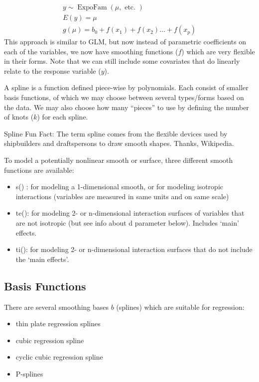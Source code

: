 \documentclass[
]{book}
\providecommand{\tightlist}{%
  \setlength{\itemsep}{0pt}\setlength{\parskip}{0pt}}
\begin{document}
\[
\begin{gathered}
y \sim \operatorname{ExpoFam}(\mu, \text { etc. }) \\
E(y)=\mu \\
g(\mu)=b_{0}+f\left(x_{1}\right)+f\left(x_{2}\right) \ldots+f\left(x_{p}\right)
\end{gathered}
\] This approach is similar to GLM, but now instead of parametric
coefficients on each of the variables, we now have smoothing functions
(\(f\)) which are very flexible in their forms. Note that we can still
include some covariates that do linearly relate to the response variable
(\(y\)).

A spline is a function defined piece-wise by polynomials. Each consist
of smaller basis functions, of which we may choose between several
types/forms based on the data. We may also choose how many ``pieces'' to
use by defining the number of knots (\(k\)) for each spline.

Spline Fun Fact: The term spline comes from the flexible devices used by
shipbuilders and draftspersons to draw smooth shapes. Thanks, Wikipedia.

To model a potentially nonlinear smooth or surface, three different
smooth functions are available:

\begin{itemize}
\tightlist
\item
  s() : for modeling a 1-dimensional smooth, or for modeling isotropic
  interactions (variables are measured in same units and on same
  scale)
\item
  te(): for modeling 2- or n-dimensional interaction surfaces of
  variables that are not isotropic (but see info about d parameter
  below). Includes `main' effects.
\item
  ti(): for modeling 2- or n-dimensional interaction surfaces that do
  not include the `main effects'.
\end{itemize}

\hypertarget{basis-functions}{%
\subsection{Basis Functions}\label{basis-functions}}

There are several smoothing bases \(b\) (splines) which are suitable for
regression:

\begin{itemize}
\tightlist
\item
  thin plate regression splines
\item
  cubic regression spline
\item
  cyclic cubic regression spline
\item
  P-splines
\end{itemize}
\end{document}
